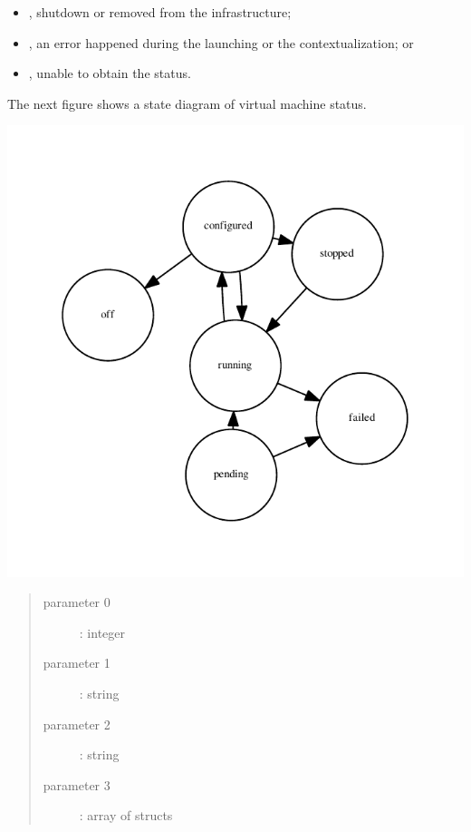 \documentclass[letterpaper,10pt,english]{sphinxmanual}
\begin{document}
\begin{description}
\begin{itemize}
\item {} 
, shutdown or removed from the infrastructure;

\item {} 
, an error happened during the launching or the contextualization; or

\item {} 
, unable to obtain the status.

\end{itemize}

The next figure shows a state diagram of virtual machine status.

\includegraphics{graphviz-efdf49fbb74513f9f59ebf60f051a790e117d45c.pdf}

\item[{\code{AlterVM}}] \leavevmode\begin{quote}\begin{description}
\item[{parameter 0}] \leavevmode
{}: integer

\item[{parameter 1}] \leavevmode
{}: string

\item[{parameter 2}] \leavevmode
{}: string

\item[{parameter 3}] \leavevmode
{}: array of structs


\end{description}
\end{quote}
\end{description}
\end{document}
